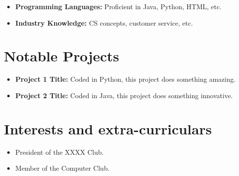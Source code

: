 \documentclass[11pt,a4paper,sans]{moderncv}
\begin{document}
\vspace{3pt}

\begin{itemize} %
\item \textbf{Programming Languages:} Proficient in Java, Python, HTML, etc.
\vspace{6pt}
\item \textbf{Industry Knowledge:} CS concepts, customer service, etc.
\end{itemize} %


\section{Notable Projects}

\vspace{3pt}

\begin{itemize} %
\item \textbf{Project 1 Title:} Coded in Python, this project does something amazing.
\item \textbf{Project 2 Title:} Coded in Java, this project does something innovative.
\end{itemize} %


\section{Interests and extra-curriculars}
\vspace{3pt}

\begin{itemize} %
\item{President of the XXXX Club.}
\item{Member of the Computer Club.}
\end{itemize} %
\end{document}
